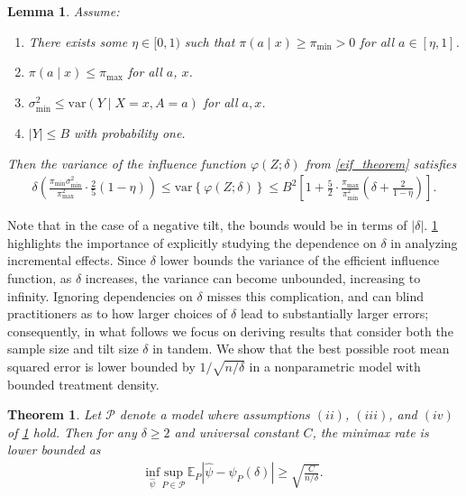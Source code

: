 \documentclass[11pt,twoside]{article}
\newcommand{\var}{\text{var}}
\newtheorem{theorem}{Theorem}
\newtheorem{lemma}{Lemma}
\theoremstyle{definition}
\theoremstyle{remark}
\begin{document}
\begin{lemma} \label{sigma_bounds}
Assume:
\begin{enumerate}
\item[(i)] There exists some $\eta \in [0, 1)$ such that $\pi(a \mid x) \geq \pi_{\min} > 0$ for all $a \in [\eta, 1]$.
\item[(ii)] $\pi(a \mid x) \leq \pi_{\max}$ for all $a$, $x$.
\item[(iii)] $\sigma^2_{\min} \leq \var(Y \mid X=x,A=a)$ for all $a,x$.
\item[(iv)] $|Y|\leq B$ with probability one.
\end{enumerate}
Then the variance of the influence function $\varphi(Z; \delta)$ from \cref{eif_theorem} satisfies
\begin{align*}
     \delta \left( \frac{\pi_{\min} \sigma^2_{\min}}{\pi^2_{\max}} \cdot \frac{2}{5}(1 - \eta) \right) \leq \var \left\{ \varphi(Z;\delta) \right\}  \leq B^2 \left[1 + \frac{5}{2} \cdot \frac{\pi_{\max}}{\pi^2_{\min}} \left(\delta + \frac{2}{1 - \eta} \right) \right].
\end{align*}
\end{lemma}

Note that in the case of a negative tilt, the bounds would be in terms of $|\delta|$. \cref{sigma_bounds} highlights the importance of explicitly studying the dependence on $\delta$ in analyzing incremental effects. Since $\delta$ lower bounds the variance of the efficient influence function, as $\delta$ increases, the variance can become unbounded, increasing to infinity. Ignoring dependencies on $\delta$ misses this complication, and can blind practitioners as to how larger choices of $\delta$ lead to substantially larger errors; consequently, in what follows we focus on deriving results that consider both the sample size and tilt size $\delta$ in tandem. We show that the best possible root mean squared error is lower bounded by $1/\sqrt{n/\delta}$ in a nonparametric model with bounded treatment density.

\begin{theorem} \label{minimax_lb}
Let $\mathcal{P}$ denote a model where assumptions $(ii)$, $(iii)$, and $(iv)$ of \cref{sigma_bounds} hold. Then for any $\delta \geq 2$ and universal constant $C$, the minimax rate is lower bounded as
\begin{align*}
    \underset{\widehat{\psi}}{\text{inf}} \, \underset{P \in \mathcal{P}}{\text{sup}} \, \mathbb{E}_P  \left|\widehat{\psi} - \psi_P(\delta) \right|  \geq \sqrt{\frac{C}{n/\delta}}.
\end{align*}
\end{theorem}
\end{document}

